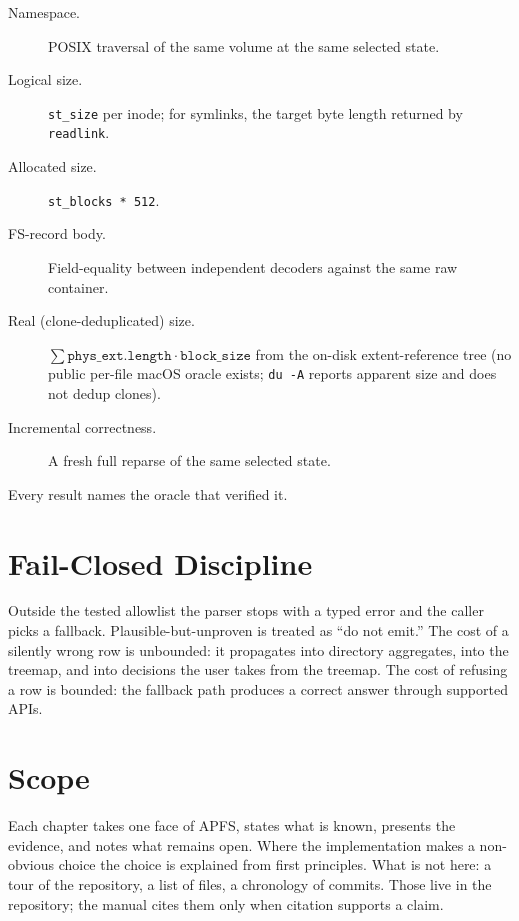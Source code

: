 \begin{description}
  \item[Namespace.] POSIX traversal of the same volume at the same
    selected state.
  \item[Logical size.] \texttt{st\_size} per inode; for symlinks,
    the target byte length returned by \texttt{readlink}.
  \item[Allocated size.] \texttt{st\_blocks * 512}.
  \item[FS-record body.] Field-equality between independent
    decoders against the same raw container.
  \item[Real (clone-deduplicated) size.] $\sum
    \texttt{phys\_ext.length} \cdot \texttt{block\_size}$ from
    the on-disk extent-reference tree (no public per-file macOS
    oracle exists; \texttt{du -A} reports apparent size and does
    not dedup clones).
  \item[Incremental correctness.] A fresh full reparse of the
    same selected state.
\end{description}

Every result names the oracle that verified it.

\section*{Fail-Closed Discipline}

Outside the tested allowlist the parser stops with a typed error
and the caller picks a fallback. Plausible-but-unproven is treated
as ``do not emit.'' The cost of a silently wrong row is unbounded:
it propagates into directory aggregates, into the treemap, and into
decisions the user takes from the treemap. The cost of refusing a
row is bounded: the fallback path produces a correct answer through
supported APIs.

\section*{Scope}

Each chapter takes one face of APFS, states what is known, presents
the evidence, and notes what remains open. Where the implementation
makes a non-obvious choice the choice is explained from first
principles. What is not here: a tour of the repository, a list of
files, a chronology of commits. Those live in the repository; the
manual cites them only when citation supports a claim.
